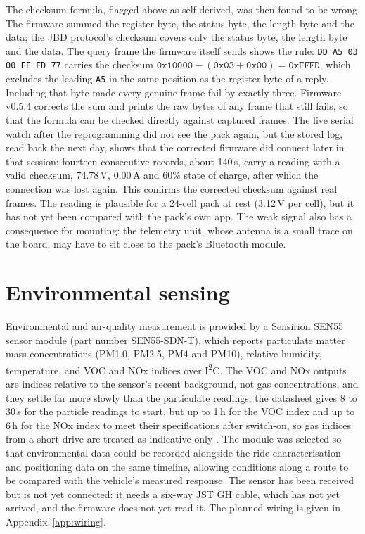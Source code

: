The checksum formula, flagged above as self-derived, was then found to be wrong. The firmware summed the register byte, the status byte, the length byte and the data; the JBD protocol's checksum covers only the status byte, the length byte and the data. The query frame the firmware itself sends shows the rule: \texttt{DD A5 03 00 FF FD 77} carries the checksum $\mathtt{0x10000} - (\mathtt{0x03} + \mathtt{0x00}) = \mathtt{0xFFFD}$, which excludes the leading \texttt{A5} in the same position as the register byte of a reply. Including that byte made every genuine frame fail by exactly three. Firmware v0.5.4 corrects the sum and prints the raw bytes of any frame that still fails, so that the formula can be checked directly against captured frames. The live serial watch after the reprogramming did not see the pack again, but the stored log, read back the next day, shows that the corrected firmware did connect later in that session: fourteen consecutive records, about 140\,s, carry a reading with a valid checksum, 74.78\,V, 0.00\,A and 60\% state of charge, after which the connection was lost again. This confirms the corrected checksum against real frames. The reading is plausible for a 24-cell pack at rest (3.12\,V per cell), but it has not yet been compared with the pack's own app. The weak signal also has a consequence for mounting: the telemetry unit, whose antenna is a small trace on the board, may have to sit close to the pack's Bluetooth module.

\section{Environmental sensing}
\label{sec:environmental-sensing}

Environmental and air-quality measurement is provided by a Sensirion SEN55 sensor module (part number SEN55-SDN-T), which reports particulate matter mass concentrations (PM1.0, PM2.5, PM4 and PM10), relative humidity, temperature, and VOC and NOx indices over I\textsuperscript{2}C. The VOC and NOx outputs are indices relative to the sensor's recent background, not gas concentrations, and they settle far more slowly than the particulate readings: the datasheet gives 8 to 30\,s for the particle readings to start, but up to 1\,h for the VOC index and up to 6\,h for the NOx index to meet their specifications after switch-on, so gas indices from a short drive are treated as indicative only \cite{sensirionsen5x}. The module was selected so that environmental data could be recorded alongside the ride-characterisation and positioning data on the same timeline, allowing conditions along a route to be compared with the vehicle's measured response. The sensor has been received but is not yet connected: it needs a six-way JST GH cable, which has not yet arrived, and the firmware does not yet read it. The planned wiring is given in Appendix~\ref{app:wiring}.

